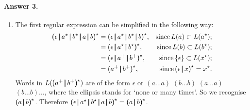 \paragraph{Answer 3.}

\begin{enumerate}

  \item The first regular expression can be simplified in the
    following way:
   \begin{align*}
     \textsf{(} \epsilon \, \pmb{\lvert}{} \, a^{\star}{} \, \pmb{\lvert}{} \,
     b^{\star}{} \, \pmb{\lvert}{} \, a \, \pmb{\lvert}{} \, b \textsf{)}^{\star}
     &= \textsf{(} \epsilon \, \pmb{\lvert}{} \, a^{\star}{} \, \pmb{\lvert}{} \,
     b^{\star}{} \, \pmb{\lvert}{} \, b\textsf{)}^{\star}, & \text{since}
     \, L(a) \subset L(a^{\star});\\
     &= \textsf{(} \epsilon \, \pmb{\lvert}{} \, a^{\star}{} \, \pmb{\lvert}{} \,
     b^{\star}\textsf{)}^{\star}, & \text{since} \,
     L(b) \subset L(b^{\star});\\
     &= \textsf{(} \epsilon \, \pmb{\lvert}{} \, a^{+}{} \, \pmb{\lvert}{} \,
     b^{+}\textsf{)}^{\star}, & \text{since} \, \{\epsilon\}
     \subset L(x^{\star});\\
     &= \textsf{(} a^{+}{} \, \pmb{\lvert}{} \, b^{+}\textsf{)}^{\star}, &
     \text{since} \, \textsf{(}\epsilon \, \pmb{\lvert}{} \,
     x\textsf{)}^{\star} = x^{\star}.
   \end{align*}
   Words in \(L(\textsf{(} a^{+}{} \, \pmb{\lvert}{} \,
   b^{+}\textsf{)}^{\star})\) are of the form \(\epsilon\) or
   \((a\ldots a)\) \((b \ldots b)\) \((a\ldots a)\) \((b\ldots
    b)\ldots\), where the ellipsis stands for `none or many times'.
   So we recognise \(\textsf{(} a \, \pmb{\lvert}{} \,
   b\textsf{)}^{\star}\). Therefore \(\textsf{(} \epsilon \, \pmb{\lvert}{}
   \, a^{\star}{} \, \pmb{\lvert}{} \, b^{\star}{} \, \pmb{\lvert}{} \, a \,
   \pmb{\lvert}{} \, b \textsf{)}^{\star} = \textsf{(} a \, \pmb{\lvert}{} \,
   b\textsf{)}^{\star}\).


\end{enumerate}
